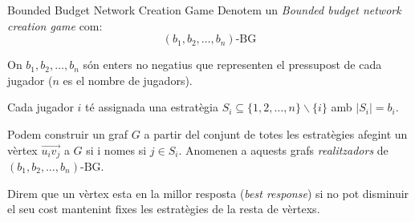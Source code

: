 \documentclass[aspectratio=169]{beamer}
\begin{document}
\begin{frame}{Bounded Budget Network Creation Game}
    Denotem un \emph{Bounded budget network creation game} com:
    $$ (b_1, b_2, \dots , b_n)\text{-BG} $$
    
    On $b_1,b_2, \dots , b_n$ són enters no negatius que representen el pressupost de cada jugador ($n$ es el nombre de jugadors).
    
    \vspace{1em}
    
    Cada jugador $i$ té assignada una estratègia $S_i \subseteq \{1, 2, \dots , n\} \backslash \{i\}$ amb
    $|S_i| = b_i$.
    
    \vspace{1em}
    
    Podem construir un graf $G$ a partir del conjunt de totes les estratègies afegint un vèrtex $\overrightarrow{u_iv_j}$
    a $G$ si i nomes si $j \in S_i$. Anomenen a aquests grafs \emph{realitzadors} de
    $ (b_1, b_2, \dots , b_n)\text{-BG} $.
    
    \vspace{1em}
    
    Direm que un vèrtex esta en la millor resposta (\emph{best response}) si no pot disminuir el seu
    cost mantenint fixes les estratègies de la resta de vèrtexs.
\end{frame}
\end{document}
